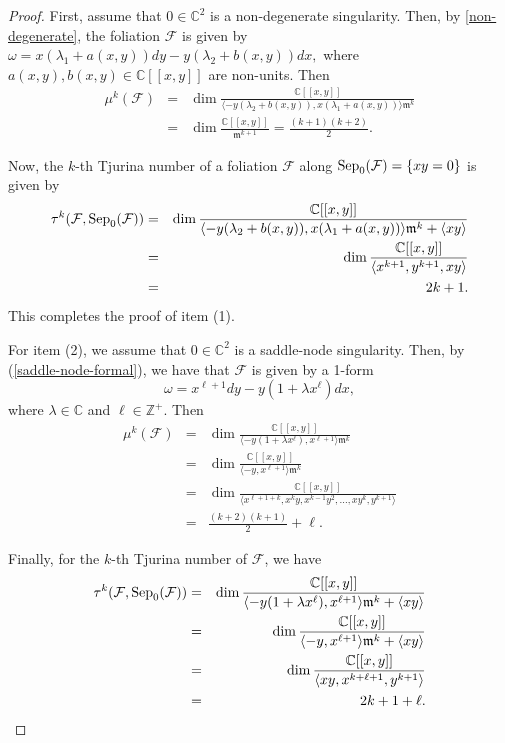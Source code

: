 \documentclass[12pt,letterpaper]{amsart}
\newcommand{\C}{\mathbb{C}}
\newcommand{\F}{\mathcal{F}}
\newcommand{\m}{\mathfrak{m}}
\newcommand{\sep}{\mbox{\rm Sep}}
\begin{document}
\begin{proof}
First, assume that $0 \in \C^2$ is a non-degenerate singularity. Then, by \ref{non-degenerate}, the foliation $\mathcal{F}$ is given by
$\omega = x(\lambda_1 + a(x,y))dy - y(\lambda_2 + b(x,y))dx,$
where $a(x,y), b(x,y) \in {\mathbb C}[[x,y]]$ are non-units.
Then
\begin{eqnarray*}
\mu^{k}(\mathcal{F}) &=& \dim \frac{\C[[x,y]]}{ \langle-y(\lambda_2 + b(x,y)), x(\lambda_1 + a(x,y))\rangle\m^{k}}\\
&=& \dim  \frac{\C[[x,y]]}{\m^{k+1}}= \frac{(k+1)(k+2)}{2}.
\end{eqnarray*}


Now, the $k$-th Tjurina number of a foliation $\mathcal{F}$ along $\sep_0(\F) = \{xy = 0\}$ is given by
\begin{eqnarray*}
\tau^{k}(\mathcal{F},\sep_0(\F)) &=& \dim \frac{\C[[x,y]]}{ \langle-y(\lambda_2 + b(x,y)), x(\lambda_1 + a(x,y))\rangle\m^{k} + \langle xy\rangle}\\
&=& \dim\frac{\C[[x,y]]}{\langle x^{k+1}, y^{k+1}, xy\rangle}\\
&=& 2k + 1.
\end{eqnarray*}
 This completes the proof of item (1).

\par For item (2), we assume that $0 \in \C^2$ is a saddle-node singularity. Then, by (\ref{saddle-node-formal}), we have that $\F$ is given by a 1-form
\begin{equation*}
\omega = x^{\ell+1} dy - y(1 + \lambda x^{\ell})dx,
\end{equation*}
where $\lambda \in \mathbb{C}$ and $\ell \in \mathbb{Z}^{+}$. Then
\begin{eqnarray*}
\mu^{k}(\mathcal{F})&=& \dim\frac{\C[[x,y]]}{\langle -y(1 + \lambda x^{\ell}), x^{\ell+1}\rangle \m^{k}}\\
&=& \dim\frac{\C[[x,y]]}{\langle -y, x^{\ell+1}\rangle\m^k}\\
&=& \dim\frac{\C[[x,y]]}{\langle x^{\ell+1+k}, x^{k}y, x^{k-1}y^{2}, \ldots, xy^{k}, y^{k+1}\rangle}\\
&=& \frac{(k+2)(k+1)}{2} + \ell.
\end{eqnarray*}

Finally, for the $k$-th Tjurina number of $\F$, we have
\begin{eqnarray*}
\tau^{k}(\mathcal{F}, \sep_0(\F)) &=& \dim\frac{\C[[x,y]]}{\langle -y(1 + \lambda x^{\ell}), x^{\ell+1}\rangle\m^{k} + \langle xy\rangle}\\
&=& \dim\frac{\C[[x,y]]}{\langle -y, x^{\ell+1}\rangle \m^{k} + \langle xy\rangle}\\
&=& \dim\frac{\C[[x,y]]}{\langle xy, x^{k+\ell+1}, y^{k+1}\rangle}\\
&=& 2k + 1 + \ell.
\end{eqnarray*}
\end{proof}
\end{document}
